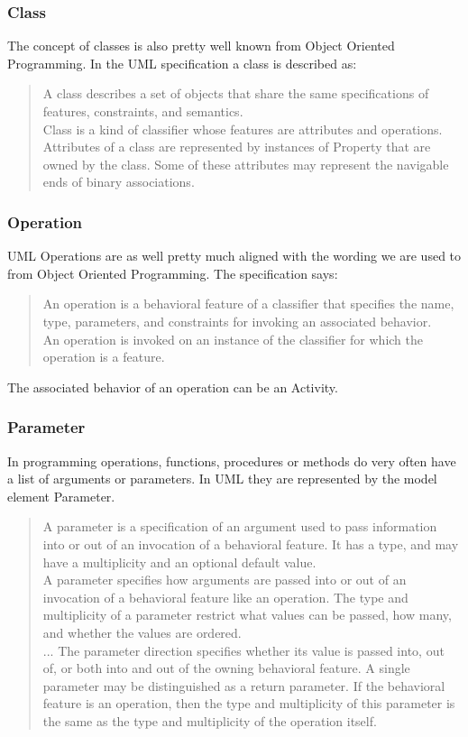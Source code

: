 \subsubsection{Class}
The concept of classes is also pretty well known from Object Oriented Programming. In the UML specification a class is described as:
\begin{quotation}
A class describes a set of objects that share the same specifications of features, constraints, and semantics.\\
Class is a kind of classifier whose features are attributes and operations. Attributes of a class are represented by instances
of Property that are owned by the class. Some of these attributes may represent the navigable ends of binary associations.
\cite{UML23Superstructure}\end{quotation}
\subsubsection{Operation}
UML Operations are as well pretty much aligned with the wording we are used to from Object Oriented Programming. The specification says:
\begin{quotation}
An operation is a behavioral feature of a classifier that specifies the name, type, parameters, and constraints for invoking
an associated behavior.\\
An operation is invoked on an instance of the classifier for which the operation is a feature.
\end{quotation}
The associated behavior of an operation can be an Activity.
\subsubsection{Parameter} 
In programming operations, functions, procedures or methods do very often have a list of arguments or parameters. In UML they are represented by the model element Parameter.
\begin{quotation}
A parameter is a specification of an argument used to pass information into or out of an invocation of a behavioral feature. It has a type, and may have a multiplicity and an optional default value.\\
A parameter specifies how arguments are passed into or out of an invocation of a behavioral feature like an operation. The
type and multiplicity of a parameter restrict what values can be passed, how many, and whether the values are ordered.\\
...
The parameter direction specifies whether its value is passed into, out of, or both into and out of the owning behavioral
feature. A single parameter may be distinguished as a return parameter. If the behavioral feature is an operation, then the
type and multiplicity of this parameter is the same as the type and multiplicity of the operation itself.
\cite{UML23Superstructure}
\end{quotation}

